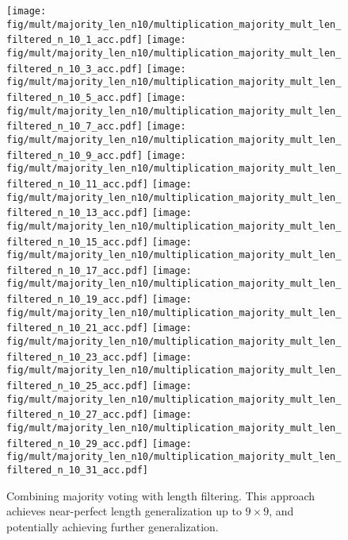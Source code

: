 \begin{figure}
    \centering
    \texttt{[image: fig/mult/majority\_len\_n10/multiplication\_majority\_mult\_len\_filtered\_n\_10\_1\_acc.pdf]}
    \texttt{[image: fig/mult/majority\_len\_n10/multiplication\_majority\_mult\_len\_filtered\_n\_10\_3\_acc.pdf]}
    \texttt{[image: fig/mult/majority\_len\_n10/multiplication\_majority\_mult\_len\_filtered\_n\_10\_5\_acc.pdf]}
    \texttt{[image: fig/mult/majority\_len\_n10/multiplication\_majority\_mult\_len\_filtered\_n\_10\_7\_acc.pdf]}
    \vspace{1mm}
    \texttt{[image: fig/mult/majority\_len\_n10/multiplication\_majority\_mult\_len\_filtered\_n\_10\_9\_acc.pdf]}
    \texttt{[image: fig/mult/majority\_len\_n10/multiplication\_majority\_mult\_len\_filtered\_n\_10\_11\_acc.pdf]}
    \texttt{[image: fig/mult/majority\_len\_n10/multiplication\_majority\_mult\_len\_filtered\_n\_10\_13\_acc.pdf]}
    \texttt{[image: fig/mult/majority\_len\_n10/multiplication\_majority\_mult\_len\_filtered\_n\_10\_15\_acc.pdf]}
    \vspace{1mm}
    \texttt{[image: fig/mult/majority\_len\_n10/multiplication\_majority\_mult\_len\_filtered\_n\_10\_17\_acc.pdf]}    
    \texttt{[image: fig/mult/majority\_len\_n10/multiplication\_majority\_mult\_len\_filtered\_n\_10\_19\_acc.pdf]}
    \texttt{[image: fig/mult/majority\_len\_n10/multiplication\_majority\_mult\_len\_filtered\_n\_10\_21\_acc.pdf]}
    \texttt{[image: fig/mult/majority\_len\_n10/multiplication\_majority\_mult\_len\_filtered\_n\_10\_23\_acc.pdf]}
    \vspace{1mm}
    \texttt{[image: fig/mult/majority\_len\_n10/multiplication\_majority\_mult\_len\_filtered\_n\_10\_25\_acc.pdf]}
    \texttt{[image: fig/mult/majority\_len\_n10/multiplication\_majority\_mult\_len\_filtered\_n\_10\_27\_acc.pdf]}
    \texttt{[image: fig/mult/majority\_len\_n10/multiplication\_majority\_mult\_len\_filtered\_n\_10\_29\_acc.pdf]}
    \texttt{[image: fig/mult/majority\_len\_n10/multiplication\_majority\_mult\_len\_filtered\_n\_10\_31\_acc.pdf]}
    \caption{Combining majority voting with length filtering. This approach achieves near-perfect length generalization up to $9 \times 9$, and potentially achieving further generalization. }
    \label{fig:multiplication_mv_len_n10_full}
\end{figure}



